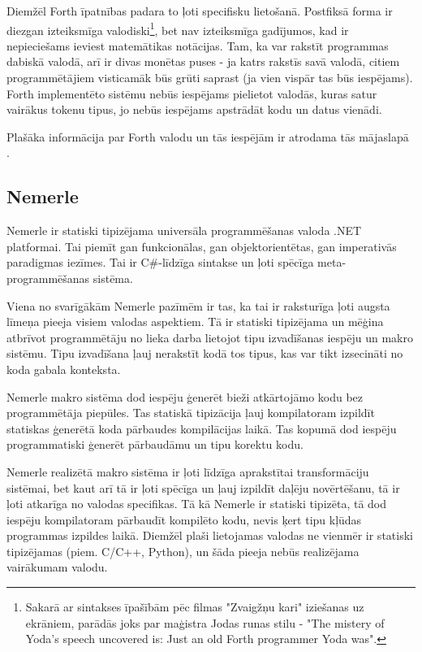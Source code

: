 Diemžēl Forth īpatnības padara to ļoti specifisku lietošanā. Postfiksā forma ir diezgan izteiksmīga valodiski\footnote{Sakarā ar sintakses īpašībām pēc filmas "Zvaigžņu kari" iziešanas uz ekrāniem, parādās joks par maģistra Jodas runas stilu - "The mistery of Yoda’s speech uncovered is: Just an old Forth programmer Yoda was".}, bet nav izteiksmīga gadījumos, kad ir nepieciešams ieviest matemātikas notācijas. Tam, ka var rakstīt programmas dabiskā valodā, arī ir divas monētas puses - ja katrs rakstīs savā valodā, citiem programmētājiem visticamāk būs grūti saprast (ja vien vispār tas būs iespējams). Forth implementēto sistēmu nebūs iespējams pielietot valodās, kuras satur vairākus tokenu tipus, jo nebūs iespējams apstrādāt kodu un datus vienādi.

Plašāka informācija par Forth valodu un tās iespējām ir atrodama tās mājaslapā \cite{ForthHome}.

\subsection{\label{sbs:rel_nemerle}Nemerle}

Nemerle ir statiski tipizējama universāla programmēšanas valoda .NET platformai. Tai piemīt gan funkcionālas, gan objektorientētas, gan imperativās paradigmas iezīmes. Tai ir C\#-līdzīga sintakse un ļoti spēcīga meta-programmēšanas sistēma.

Viena no svarīgākām Nemerle pazīmēm ir tas, ka tai ir raksturīga ļoti augsta līmeņa pieeja visiem valodas aspektiem. Tā ir statiski tipizējama un mēģina atbrīvot programmētāju no lieka darba lietojot tipu izvadīšanas iespēju un makro sistēmu. Tipu izvadīšana ļauj nerakstīt kodā tos tipus, kas var tikt izsecināti no koda gabala konteksta.

Nemerle makro sistēma dod iespēju ģenerēt bieži atkārtojāmo kodu bez programmētāja piepūles. Tas statiskā tipizācija ļauj kompilatoram izpildīt statiskas ģenerētā koda pārbaudes kompilācijas laikā. Tas kopumā dod iespēju programmatiski ģenerēt pārbaudāmu un tipu korektu kodu.

Nemerle realizētā makro sistēma ir ļoti līdzīga aprakstītai transformāciju sistēmai, bet kaut arī tā ir ļoti spēcīga un ļauj izpildīt daļēju novērtēšanu, tā ir ļoti atkarīga no valodas specifikas. Tā kā Nemerle ir statiski tipizēta, tā dod iespēju kompilatoram pārbaudīt kompilēto kodu, nevis ķert tipu kļūdas programmas izpildes laikā. Diemžēl plaši lietojamas valodas ne vienmēr ir statiski tipizējamas (piem. C/C++, Python), un šāda pieeja nebūs realizējama vairākumam valodu. 

